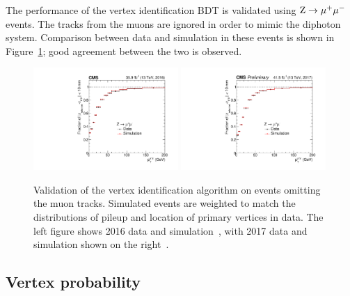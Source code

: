 The performance of the vertex identification BDT is
validated using $\mathrm{Z}\rightarrow{\mu^{+}\mu^{-}}$ events.
The tracks from the muons are ignored in order to mimic the diphoton system.
Comparison between data and simulation in these events is shown in Figure~\ref{fig:obj_VtxId}; 
good agreement between the two is observed.

\begin{figure}[h!]
  \centering
  \includegraphics[width=0.49\textwidth]{Figures/Objects/VtxId2016}
  \includegraphics[width=0.49\textwidth]{Figures/Objects/VtxId2017}
  \caption[Vertex identification validation in \Zmumu events.]
  {
    Validation of the \Hgg vertex identification algorithm on \Zmumu events
    omitting the muon tracks. 
    Simulated events are weighted to match the distributions of pileup
    and location of primary vertices in data.
    The left figure shows 2016 data and simulation~\cite{HIG-16-040}, 
    with 2017 data and simulation shown on the right~\cite{HIG-18-029}.
  }
  \label{fig:obj_VtxId}
\end{figure}

\subsection{Vertex probability}

